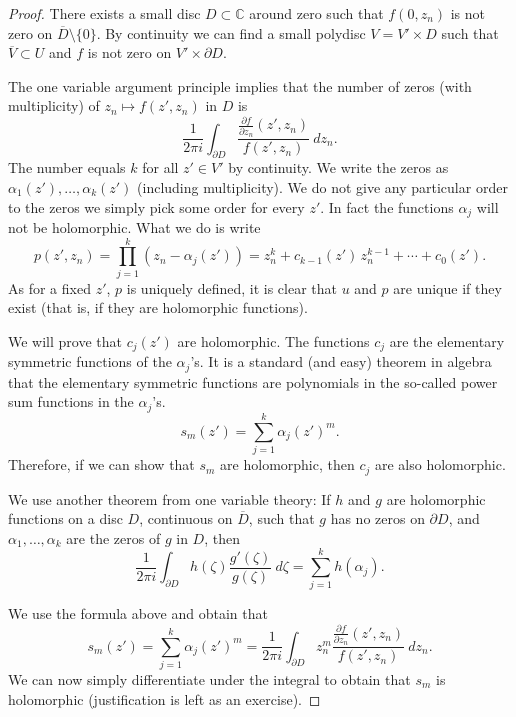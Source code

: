 \documentclass[12pt,openany]{book}
\newcommand{\C}{{\mathbb{C}}}
\theoremstyle{plain}
\theoremstyle{remark}
\theoremstyle{definition}
\theoremstyle{exercise}
\theoremstyle{example}
\begin{document}
\begin{proof}
There exists a small disc $D \subset \C$ around zero such that
$f(0,z_n)$ is not zero on $\overline{D} \setminus \{ 0 \}$.  By continuity
we can find a small polydisc $V = V' \times D$ such that
$\overline{V} \subset U$ and $f$ is not zero on
$V' \times \partial D$.

The one variable argument principle implies that the number of zeros (with
multiplicity) of $z_n
\mapsto f(z',z_n)$ in $D$ is
\begin{equation}
\frac{1}{2\pi i}
\int_{\partial D}
\frac{\frac{\partial f}{\partial z_n} (z',z_n)}{f(z',z_n)} ~dz_n .
\end{equation}
The number equals $k$ for all $z' \in V'$ by continuity.  We
write the zeros as $\alpha_1(z'),\ldots,\alpha_k(z')$ (including
multiplicity).  We do not give any particular order to the zeros
we simply pick some order for every $z'$.
In fact the functions $\alpha_j$ will not be holomorphic.  What we do is
write
\begin{equation}
p(z',z_n)
=
\prod_{j=1}^k (z_n-\alpha_j(z'))
=
z_n^k + c_{k-1}(z') \, z_n^{k-1} + \cdots + c_0 (z') .
\end{equation}
As for a fixed $z'$, $p$ is uniquely defined, it is
clear that
$u$ and $p$ are unique if they exist (that is, if they are holomorphic
functions).

We will prove that $c_j(z')$ are holomorphic.  The functions $c_j$ are
the elementary symmetric functions of the $\alpha_j$'s.  It is a standard (and
easy) theorem in algebra that the elementary symmetric functions are
polynomials in the so-called power sum functions in the $\alpha_j$'s.
\begin{equation}
s_m(z') = \sum_{j=1}^k \alpha_j(z')^m .
\end{equation}
Therefore, if we can show that $s_m$ are holomorphic, then $c_j$ are also
holomorphic.

We use another theorem from one variable theory: If $h$ and $g$ are
holomorphic functions on a disc $D$, continuous on $\overline{D}$,
such that $g$ has no zeros on $\partial D$, and $\alpha_1,\ldots,\alpha_k$
are the zeros of $g$ in $D$, then
\begin{equation}
\frac{1}{2 \pi i}
\int_{\partial D} h(\zeta) \frac{g'(\zeta)}{g(\zeta)} ~d\zeta
= \sum_{j=1}^k h(\alpha_j) .
\end{equation}

We use the formula above and obtain that
\begin{equation}
s_m(z') = 
\sum_{j=1}^k \alpha_j(z')^m
=
\frac{1}{2\pi i}
\int_{\partial D}
z_n^m
\frac{\frac{\partial f}{\partial z_n} (z',z_n)}{f(z',z_n)} ~dz_n .
\end{equation}
We can now simply differentiate under the integral to obtain that $s_m$
is holomorphic (justification is left as an exercise).
\end{proof}
\end{document}
